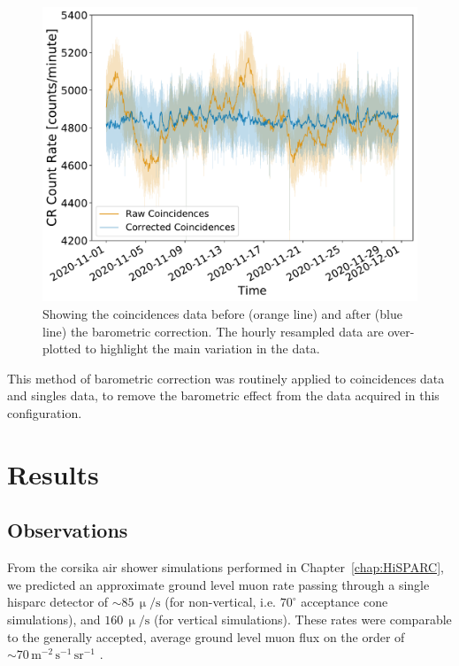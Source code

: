 \begin{figure}[htbp!]
	\centering
	\includegraphics[width=0.7\columnwidth]{raw_vs_corrected_coincidences.pdf}
	\caption{Showing the coincidences data before (orange line) and after (blue line) the barometric correction. The hourly resampled data are over-plotted to highlight the main variation in the data.}
	\label{fig:HS_14008_corrected_coincidences}
\end{figure}


This method of barometric correction was routinely applied to coincidences data and singles data, to remove the barometric effect from the data acquired in this configuration. %



\section{Results}\label{sec:HS_14008_results}

\subsection{Observations}\label{sec:HS_14008_observations}

From the \gls{corsika} air shower simulations performed in Chapter~\ref{chap:HiSPARC}, we predicted an approximate ground level muon rate passing through a single \gls{hisparc} detector of $\sim 85 \, \upmu/\mathrm{s}$ (for non-vertical, i.e. $70^\circ$ acceptance cone simulations), and $160 \, \upmu/\mathrm{s}$ (for vertical simulations). These rates were comparable to the generally accepted, average ground level muon flux on the order of $\sim 70 \, \mathrm{m}^{-2}\,\mathrm{s}^{-1}\,\mathrm{sr}^{-1}$ \citep{cecchini_cosmic_2000, blackmore_terrestrial_2015, pereira_ground_2020, particle_data_group_review_2020}.

